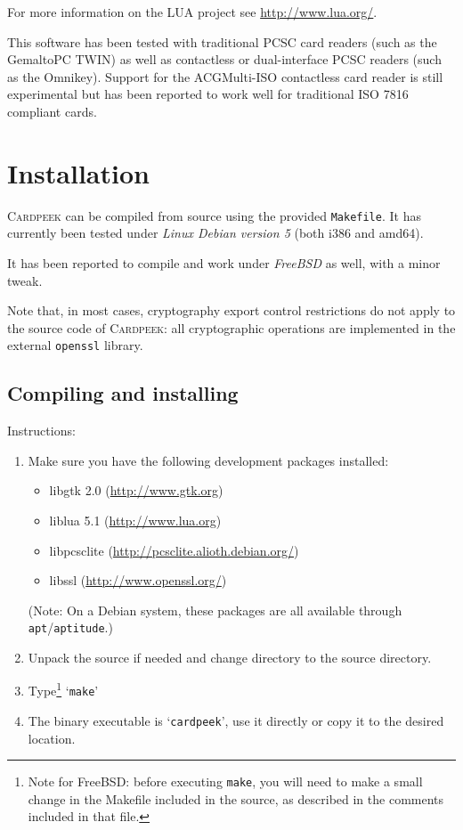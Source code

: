 \documentclass[11pt]{report}
\newcommand{\Cardpeek}{\textsc{Cardpeek}}
\begin{document}
For more information on the LUA project see \url{http://www.lua.org/}.

This software has been tested with traditional PCSC card readers (such as the Gemalto\texttrademark PC TWIN) 
as well as contactless or dual-interface PCSC readers (such as the Omnikey). 
Support for the ACG\texttrademark Multi-ISO contactless card reader is still experimental but has been 
reported to work well for traditional ISO 7816 compliant cards.

\tableofcontents

\chapter{Installation}

\Cardpeek{} can be compiled from source using the provided \texttt{Makefile}.
It has currently been tested under \emph{Linux Debian version 5} (both i386 and amd64).

It has been reported to compile and work under \emph{FreeBSD} as well, with a minor tweak.

Note that, in most cases, cryptography export control restrictions do not apply to the source code
of \Cardpeek: all cryptographic operations are implemented in the external \texttt{openssl} 
library.

\section{Compiling and installing}

Instructions:
\begin{enumerate}
\item{Make sure you have the following development packages installed:
  \begin{itemize}
  \item{libgtk 2.0 (\url{http://www.gtk.org})}
  \item{liblua 5.1 (\url{http://www.lua.org})}
  \item{libpcsclite (\url{http://pcsclite.alioth.debian.org/})}
  \item{libssl (\url{http://www.openssl.org/})}
  \end{itemize}
(Note: On a Debian system, these packages are all available through \texttt{apt}/\texttt{aptitude}.)}
\item{Unpack the source if needed and change directory to the source directory.}
\item{Type\footnote{Note for FreeBSD: before executing \texttt{make}, 
you will need to make a small change in the Makefile included in the source, 
as described in the comments included in that file.} `\texttt{make}'}
\item{The binary executable is `\texttt{cardpeek}', use it directly or copy it to the desired location.}
\end{enumerate}
\end{document}
